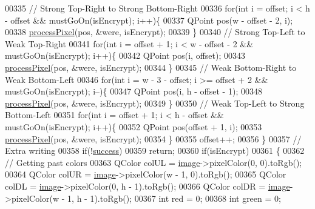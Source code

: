 \begin{DoxyCode}
00335         \textcolor{comment}{// Strong Top-Right to Strong Bottom-Right}
00336         \textcolor{keywordflow}{for}(\textcolor{keywordtype}{int} i = offset; i < h - offset && mustGoOn(isEncrypt); i++)\{
00337             QPoint pos(w - offset - 2, i);
00338             \mbox{\hyperlink{class_model_p_c_a1171f9fe1550133dc9053a46b4e5bcfd}{processPixel}}(pos, &were, isEncrypt);
00339         \}
00340         \textcolor{comment}{// Strong Top-Left to Weak Top-Right}
00341         \textcolor{keywordflow}{for}(\textcolor{keywordtype}{int} i = offset + 1; i < w - offset - 2 && mustGoOn(isEncrypt); i++)\{
00342             QPoint pos(i, offset);
00343             \mbox{\hyperlink{class_model_p_c_a1171f9fe1550133dc9053a46b4e5bcfd}{processPixel}}(pos, &were, isEncrypt);
00344         \}
00345         \textcolor{comment}{// Weak Bottom-Right to Weak Bottom-Left}
00346         \textcolor{keywordflow}{for}(\textcolor{keywordtype}{int} i = w - 3 - offset; i >= offset + 2 && mustGoOn(isEncrypt); i--)\{
00347             QPoint pos(i, h - offset - 1);
00348             \mbox{\hyperlink{class_model_p_c_a1171f9fe1550133dc9053a46b4e5bcfd}{processPixel}}(pos, &were, isEncrypt);
00349         \}
00350         \textcolor{comment}{// Weak Top-Left to Strong Bottom-Left}
00351         \textcolor{keywordflow}{for}(\textcolor{keywordtype}{int} i = offset + 1; i < h - offset && mustGoOn(isEncrypt); i++)\{
00352             QPoint pos(offset + 1, i);
00353             \mbox{\hyperlink{class_model_p_c_a1171f9fe1550133dc9053a46b4e5bcfd}{processPixel}}(pos, &were, isEncrypt);
00354         \}
00355         offset++;
00356     \}
00357     \textcolor{comment}{// Extra writing}
00358     \textcolor{keywordflow}{if}(!\mbox{\hyperlink{class_model_p_c_a945ffbbc44a832b953c191debd448f4c}{success}})
00359         \textcolor{keywordflow}{return};
00360     \textcolor{keywordflow}{if}(isEncrypt)
00361     \{
00362         \textcolor{comment}{// Getting past colors}
00363         QColor colUL = \mbox{\hyperlink{namespacetests-setup_ad55b685280f549e15688a94cbb89f512}{image}}->pixelColor(0, 0).toRgb();
00364         QColor colUR = \mbox{\hyperlink{namespacetests-setup_ad55b685280f549e15688a94cbb89f512}{image}}->pixelColor(w - 1, 0).toRgb();
00365         QColor colDL = \mbox{\hyperlink{namespacetests-setup_ad55b685280f549e15688a94cbb89f512}{image}}->pixelColor(0, h - 1).toRgb();
00366         QColor colDR = \mbox{\hyperlink{namespacetests-setup_ad55b685280f549e15688a94cbb89f512}{image}}->pixelColor(w - 1, h - 1).toRgb();
00367         \textcolor{keywordtype}{int} red = 0;
00368         \textcolor{keywordtype}{int} green = 0;

\end{DoxyCode}
